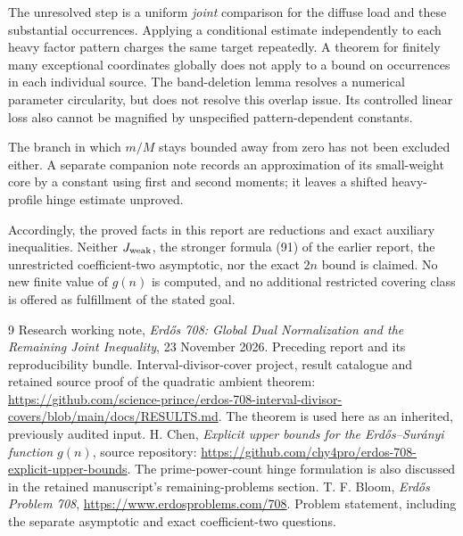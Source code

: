 \documentclass[11pt,a4paper]{article}
\theoremstyle{remark}\newtheorem{remark}[theorem]{Remark}
\begin{document}
The unresolved step is a uniform \emph{joint} comparison for the
diffuse load and these substantial occurrences. Applying a conditional
estimate independently to each heavy factor pattern charges the
same target repeatedly. A theorem for finitely many exceptional
coordinates globally does not apply to a bound on occurrences in
each individual source. The band-deletion lemma resolves a numerical
parameter circularity, but does not resolve this overlap issue.
Its controlled linear loss also cannot be magnified by unspecified
pattern-dependent constants.

The branch in which \(m/M\) stays bounded away from zero has not been
excluded either. A separate companion note records an approximation
of its small-weight core by a constant using first and second moments;
it leaves a shifted heavy-profile hinge estimate unproved.

Accordingly, the proved facts in this report are reductions and exact
auxiliary inequalities. Neither \(J_{\rm weak}\), the stronger formula
(91) of the earlier report, the unrestricted coefficient-two
asymptotic, nor the exact \(2n\) bound is claimed. No new finite value
of \(g(n)\) is computed, and no additional restricted covering class
is offered as fulfillment of the stated goal.

\begin{thebibliography}{9}
 Research working note, \emph{Erd\H{o}s 708: Global
Dual Normalization and the Remaining Joint Inequality}, 23 November
2026. Preceding report and its reproducibility bundle.
 Interval-divisor-cover project, result catalogue and
retained source proof of the quadratic ambient theorem:
\url{https://github.com/science-prince/erdos-708-interval-divisor-covers/blob/main/docs/RESULTS.md}.
The theorem is used here as an inherited, previously audited input.
 H. Chen, \emph{Explicit upper bounds for the
Erd\H{o}s--Sur\'anyi function \(g(n)\)}, source repository:
\url{https://github.com/chy4pro/erdos-708-explicit-upper-bounds}.
The prime-power-count hinge formulation is also discussed in the
retained manuscript's remaining-problems section.
 T. F. Bloom, \emph{Erd\H{o}s Problem 708},
\url{https://www.erdosproblems.com/708}. Problem statement, including
the separate asymptotic and exact coefficient-two questions.
\end{thebibliography}
\end{document}
